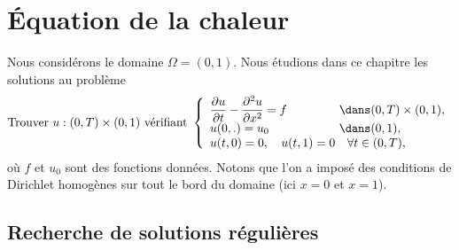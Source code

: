 \documentclass[12pt,a4paper,twoside]{article}
\begin{document}
\begin{exercise}
\begin{enumerate}
  \end{enumerate}
  

\end{exercise}


\newpage
\section{\'Equation de la chaleur}

Nous consid\'erons le domaine $\Omega = (0,1)$.
Nous \'etudions dans ce chapitre les solutions au probl\`eme
\begin{equation}
  \label{eq:chaleur_Dir}
  \text{Trouver $u : (0,T) \times (0,1)$ v\'erifiant }
  \left\{
    \begin{array}{l l}
      \dfrac{\partial u}{\partial t} - \dfrac{\partial^2 u}{\partial x^2} = f 
      & \!\!\!\! \dans (0,T) \times (0,1) ,
      \\
      u(0,.) = u_0 
      & \!\!\!\! \dans (0,1) ,
      \\
      u(t,0) = 0 , \quad u(t,1) = 0 & \forall t \in (0,T) ,
    \end{array}
  \right.
\end{equation}
o\`u $f$ et $u_0$ sont des fonctions donn\'ees.
Notons que l'on a impos\'e des conditions de Dirichlet homog\`enes sur tout le bord du domaine
(ici $x=0$ et $x=1$).


\subsection{Recherche de solutions r\'eguli\`eres}
\end{document}
